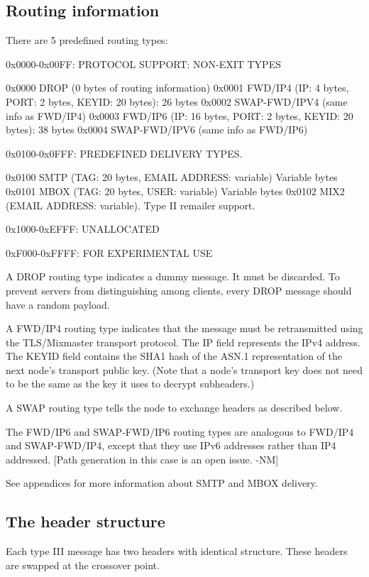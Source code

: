 \subsection{Routing information}

There are 5 predefined routing types:

0x0000-0x00FF: PROTOCOL SUPPORT: NON-EXIT TYPES

0x0000 DROP    (0 bytes of routing information)
0x0001 FWD/IP4 (IP: 4 bytes, PORT: 2 bytes, KEYID: 20 bytes): 26 bytes
0x0002 SWAP-FWD/IPV4 (same info as FWD/IP4)
0x0003 FWD/IP6 (IP: 16 bytes, PORT: 2 bytes, KEYID: 20 bytes): 38 bytes
0x0004 SWAP-FWD/IPV6 (same info as FWD/IP6)

0x0100-0x0FFF: PREDEFINED DELIVERY TYPES.

0x0100 SMTP   (TAG: 20 bytes, EMAIL ADDRESS: variable) Variable bytes
0x0101 MBOX   (TAG: 20 bytes, USER: variable) Variable bytes
0x0102 MIX2   (EMAIL ADDRESS: variable).  Type II remailer support.

0x1000-0xEFFF: UNALLOCATED

0xF000-0xFFFF: FOR EXPERIMENTAL USE

A DROP routing type indicates a dummy message. It must be discarded.
To prevent servers from distinguishing among clients, every DROP
message should have a random payload.

A FWD/IP4 routing type indicates that the message must be
retransmitted using the TLS/Mixmaster transport protocol. The IP field
represents the IPv4 address.  The KEYID field contains the SHA1 hash
of the ASN.1 representation of the next node's transport public key.
(Note that a node's transport key does not need to be the same as the
key it uses to decrypt subheaders.)

A SWAP routing type tells the node to exchange headers as described below.

The FWD/IP6 and SWAP-FWD/IP6 routing types are analogous to FWD/IP4
and SWAP-FWD/IP4, except that they use IPv6 addresses rather than IP4
addressed.  [Path generation in this case is an open issue. -NM]

See appendices for more information about SMTP and MBOX delivery.

\subsection{The header structure}

Each type III message has two headers with identical structure. These
headers are swapped at the crossover point.

